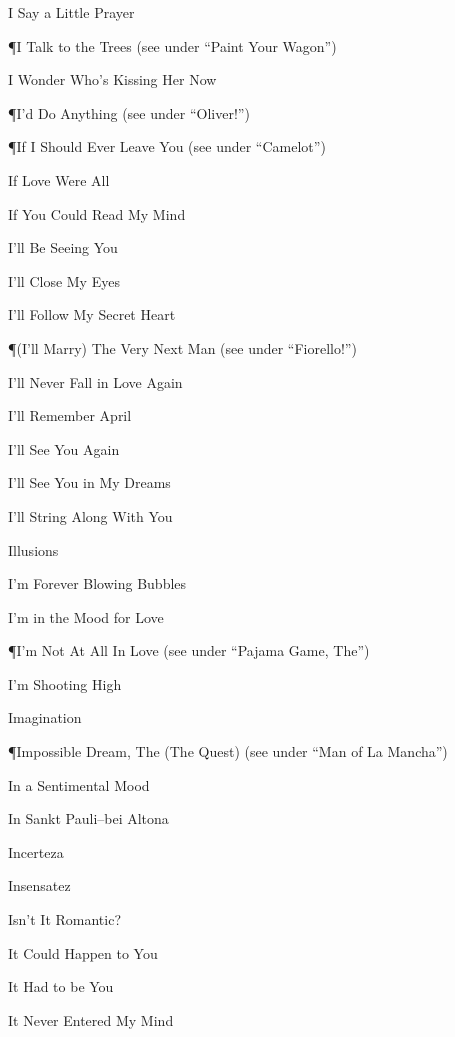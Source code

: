 \N I Say a Little Prayer

\P I Talk to the Trees
\nobreak
\T (see under ``Paint Your Wagon'')

\N I Wonder Who's Kissing Her Now

\P I'd Do Anything
\nobreak
\T (see under ``Oliver!'')

\P If I Should Ever Leave You
\nobreak
\T (see under ``Camelot'')

\N If Love Were All

\N If You Could Read My Mind

\N I'll Be Seeing You

\N I'll Close My Eyes

\N I'll Follow My Secret Heart

\P (I'll Marry) The Very Next Man
\nobreak
\T (see under ``Fiorello!'')

\N I'll Never Fall in Love Again

\N I'll Remember April

\N I'll See You Again

\N I'll See You in My Dreams

\N I'll String Along With You

\N Illusions

\N I'm Forever Blowing Bubbles

\N {}

\N I'm in the Mood for Love

\P I'm Not At All In Love
\nobreak
\T (see under ``Pajama Game, The'')

\N I'm Shooting High

\N Imagination

\P Impossible Dream, The (The Quest)
\nobreak
\T (see under ``Man of La Mancha'')

\N In a Sentimental Mood

\N In Sankt Pauli--bei Altona

\N Incerteza

\N Insensatez

\N Isn't It Romantic?

\N {}

\N It Could Happen to You

\N It Had to be You

\N It Never Entered My Mind

